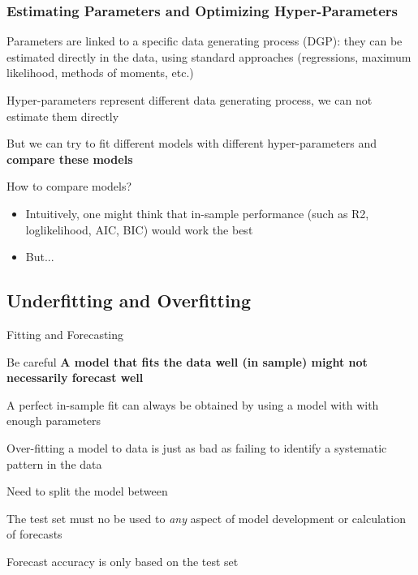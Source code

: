 \documentclass{beamer}
\newenvironment{wideitemize}{\itemize\addtolength{\itemsep}{10pt}}{\enditemize}
\begin{document}
\begin{frame}
  \frametitle{Estimating Parameters and Optimizing Hyper-Parameters}
  \begin{wideitemize}
  \item Parameters are linked to a specific data generating process (DGP): they can be estimated directly in the data, using standard approaches (regressions, maximum likelihood, methods of moments, etc.)
  \item Hyper-parameters represent different data generating process, we can not estimate them directly
  \item But we can try to fit different models with different hyper-parameters and \textbf{compare these models}
  \item How to compare models?
    \begin{itemize}
    \item Intuitively, one might think that in-sample performance (such as R2, loglikelihood, AIC, BIC) would work the best
    \item But...
    \end{itemize}
  \end{wideitemize}
\end{frame}

\subsection{Underfitting and Overfitting}

\begin{frame}{Fitting and Forecasting}

  \begin{alertblock}{Be careful}
    \textbf{A model that fits the data well (in sample) might not necessarily forecast well}
  \end{alertblock}

  \medskip  
  \begin{wideitemize}
    \item A perfect in-sample fit can always be obtained by using a model with with enough parameters
    \item Over-fitting a model to data is just as bad as failing to identify a systematic pattern in the data
    \item Need to split the model between 
    \item The test set must no be used to \emph{any} aspect of model development or calculation of forecasts
    \item Forecast accuracy is only based on the test set
  \end{wideitemize}  
\end{frame}
\end{document}
